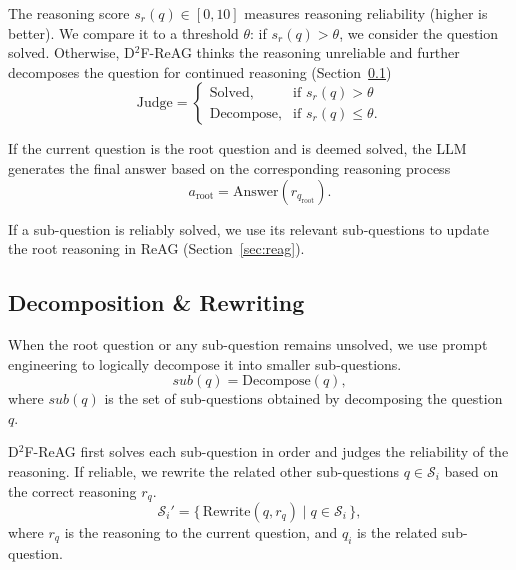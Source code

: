 \documentclass[11pt]{article}
\begin{document}
The reasoning score $s_r(q) \in [0,10]$ measures reasoning reliability (higher is better). We compare it to a threshold $\theta$: if $s_r(q) > \theta$, we consider the question solved. Otherwise, D$^2$F-ReAG thinks the reasoning unreliable and further decomposes the question for continued reasoning (Section~\ref{sec:decomposition})
\begin{equation}
    \mathrm{Judge} =
    \begin{cases}
    \text{Solved}, & \text{if } s_r(q) > \theta \\
    \text{Decompose}, & \text{if } s_r(q) \leq \theta.
    \end{cases}
\end{equation}

If the current question is the root question and is deemed solved, the LLM generates the final answer based on the corresponding reasoning process
\begin{equation}
a_{\text{root}} = \text{Answer}\!\left(r_{q_{\text{root}}}\right).
\label{eq:root_answer}
\end{equation}

If a sub-question is reliably solved, we use its relevant sub-questions to update the root reasoning in ReAG (Section~\ref{sec:reag}).

\subsection{Decomposition \& Rewriting}
\label{sec:decomposition}
When the root question or any sub-question remains unsolved, we use prompt engineering to logically decompose it into smaller sub-questions.
\begin{equation}
sub(q) = \text{Decompose}(q),
\end{equation}
where $sub(q)$ is the set of sub-questions obtained by decomposing the question $q$.

D$^2$F-ReAG first solves each sub-question in order and judges the reliability of the reasoning. If reliable, we rewrite the related other sub-questions $q \in \mathcal{S}_i$ based on the correct reasoning $r_q$. 
\begin{equation}
\mathcal{S}_i' = \{\, \text{Rewrite}(q, r_q) \mid q \in \mathcal{S}_i \,\},
\label{eq:rewrite}
\end{equation}
where $r_q$ is the reasoning to the current question, and $q_i$ is the related sub-question.
\end{document}
